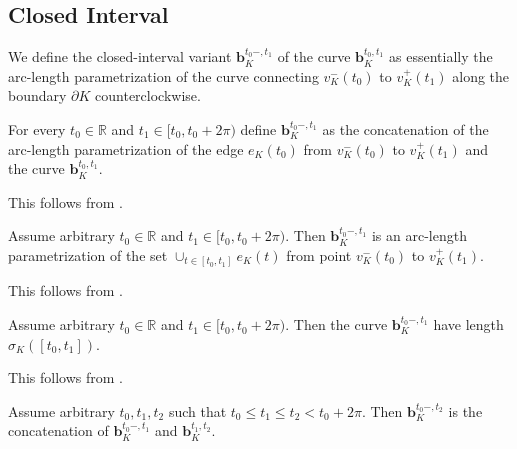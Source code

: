 \subsection{Closed Interval}

We define the closed-interval variant \(\mathbf{b}_K^{t_0-, t_1}\) of the curve \(\mathbf{b}_K^{t_0, t_1}\) as essentially the arc-length parametrization of the curve connecting \(v_K^-(t_0)\) to \(v_K^+(t_1)\) along the boundary \(\partial K\) counterclockwise.

\begin{definition}

For every \(t_0 \in \mathbb{R}\) and \(t_1 \in [t_0, t_0 + 2\pi)\) define \(\mathbf{b}_K^{t_0-, t_1}\) as the concatenation of the arc-length parametrization of the edge \(e_K(t_0)\) from \(v_K^-(t_0)\) to \(v_K^+(t_1)\) and the curve \(\mathbf{b}_K^{t_0, t_1}\).

\label{def:closed-param}
\end{definition}

This follows from .

\begin{corollary}

Assume arbitrary \(t_0 \in \mathbb{R}\) and \(t_1 \in [t_0, t_0 + 2\pi)\). Then \(\mathbf{b}_K^{t_0-, t_1}\) is an arc-length parametrization of the set \(\cup_{t \in [t_0, t_1]} e_K(t)\) from point \(v_K^-(t_0)\) to \(v_K^+(t_1)\).

\label{cor:closed-param-segment}
\end{corollary}

This follows from .

\begin{corollary}

Assume arbitrary \(t_0 \in \mathbb{R}\) and \(t_1 \in [t_0, t_0 + 2\pi)\). Then the curve \(\mathbf{b}_K^{t_0-, t_1}\) have length \(\sigma_K([t_0, t_1])\).

\label{cor:closed-param-segment-length}
\end{corollary}

This follows from .

\begin{corollary}

Assume arbitrary \(t_0, t_1, t_2\) such that \(t_0 \leq t_1 \leq t_2 < t_0 + 2\pi\). Then \(\mathbf{b}_{K}^{t_0-, t_2}\) is the concatenation of \(\mathbf{b}_{K}^{t_0-, t_1}\) and \(\mathbf{b}_{K}^{t_1, t_2}\).

\label{cor:closed-param-concatenation}
\end{corollary}


